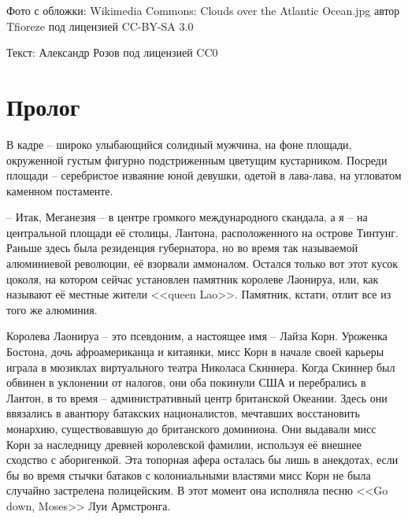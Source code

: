 \maketitle

\thispagestyle{empty}
Фото с обложки: Wikimedia Commons: Clouds over the Atlantic Ocean.jpg автор Tfioreze под лицензией CC-BY-SA 3.0

Текст: Александр Розов под лицензией CC0

\frontmatter

\chapter*{Пролог}

В кадре -- широко улыбающийся солидный мужчина, на фоне площади, окруженной густым фигурно подстриженным цветущим кустарником. Посреди площади -- серебристое изваяние юной девушки, одетой в лава-лава, на угловатом каменном постаменте.

-- Итак, Меганезия -- в центре громкого международного скандала, а я -- на центральной площади её столицы, Лантона, расположенного на острове Тинтунг. Раньше здесь была резиденция губернатора, но во время так называемой алюминиевой революции, её взорвали аммоналом. Остался только вот этот кусок цоколя, на котором сейчас установлен памятник королеве Лаонируа, или, как называют её местные жители <<queen Lao>>. Памятник, кстати, отлит все из того же алюминия.

Королева Лаонируа -- это псевдоним, а настоящее имя -- Лайза Корн. Уроженка Бостона, дочь афроамериканца и китаянки, мисс Корн в начале своей карьеры играла в мюзиклах виртуального театра Николаса Скиннера. Когда Скиннер был обвинен в уклонении от налогов, они оба покинули США и перебрались в Лантон, в то время -- административный центр британской Океании. Здесь они ввязались в авантюру батакских националистов, мечтавших восстановить монархию, существовавшую до британского доминиона. Они выдавали мисс Корн за наследницу древней королевской фамилии, используя её внешнее сходство с аборигенкой. Эта топорная афера осталась бы лишь в анекдотах, если бы во время стычки батаков с колониальными властями мисс Корн не была случайно застрелена полицейским. В этот момент она исполняла песню <<Go down, Moses>> Луи Армстронга.

